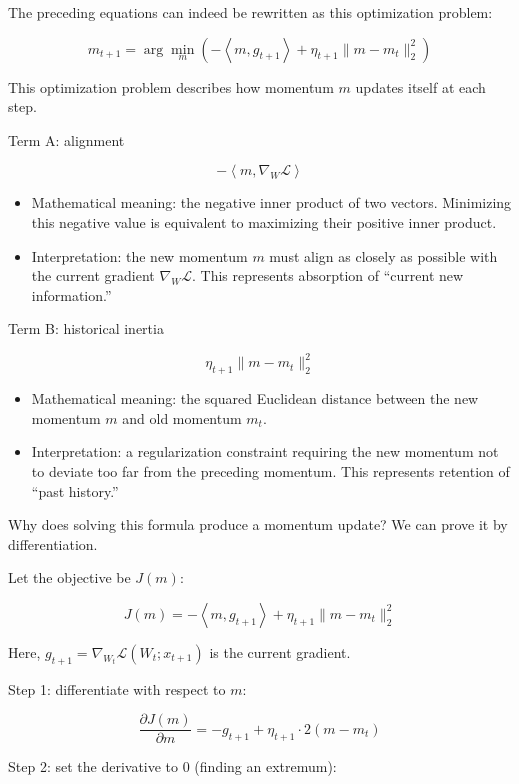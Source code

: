 The preceding equations can indeed be rewritten as this optimization problem:

\[
m_{t+1}=\arg\min_m\left(
-\left\langle m,g_{t+1}\right\rangle
+\eta_{t+1}\lVert m-m_t\rVert_2^2
\right)
\tag{10}
\]

This optimization problem describes how momentum \(m\) updates itself at each step.

Term A: alignment

\[
-\left\langle m,\nabla_W\mathcal{L}\right\rangle
\]

\begin{itemize}
\tightlist
\item
  Mathematical meaning: the negative inner product of two vectors. Minimizing this negative value is equivalent to maximizing their positive inner product.
\item
  Interpretation: the new momentum \(m\) must align as closely as possible with the current gradient \(\nabla_W\mathcal{L}\). This represents absorption of ``current new information.''
\end{itemize}

Term B: historical inertia

\[
\eta_{t+1}\lVert m-m_t\rVert_2^2
\]

\begin{itemize}
\tightlist
\item
  Mathematical meaning: the squared Euclidean distance between the new momentum \(m\) and old momentum \(m_t\).
\item
  Interpretation: a regularization constraint requiring the new momentum not to deviate too far from the preceding momentum. This represents retention of ``past history.''
\end{itemize}

Why does solving this formula produce a momentum update? We can prove it by differentiation.

Let the objective be \(J(m)\):

\[
J(m)=-\left\langle m,g_{t+1}\right\rangle+\eta_{t+1}\lVert m-m_t\rVert_2^2
\]

Here, \(g_{t+1}=\nabla_{W_t}\mathcal{L}(W_t;x_{t+1})\) is the current gradient.

Step 1: differentiate with respect to \(m\):

\[
\frac{\partial J(m)}{\partial m}=-g_{t+1}+\eta_{t+1}\cdot 2(m-m_t)
\]

Step 2: set the derivative to 0 (finding an extremum):

